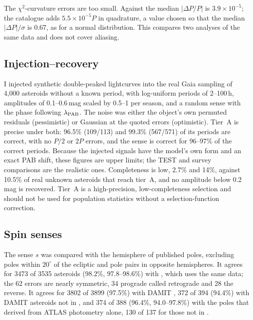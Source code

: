 The $\chi^2$-curvature errors are too small. Against \citet{Durech2023} the median $|\Delta P/P|$ is
$3.9\times10^{-5}$; the catalogue adds $5.5\times10^{-5}P$ in quadrature, a value chosen so that the median
$|\Delta P|/\sigma$ is 0.67, as for a normal distribution. This compares two analyses of the same data and
does not cover aliasing.

\subsection{Injection--recovery}

I injected synthetic double-peaked lightcurves into the real Gaia sampling of 4{,}000 asteroids without a
known period, with log-uniform periods of 2--100\,h, amplitudes of 0.1--0.6\,mag scaled by 0.5--1 per
season, and a random sense with the phase following $\lambda_{\rm PAB}$. The noise was either the object's
own permuted residuals (pessimistic) or Gaussian at the quoted errors (optimistic). Tier~A is precise under
both: 96.5\% (109/113) and 99.3\% (567/571) of its periods are correct, with no $P/2$ or $2P$ errors, and the
sense is correct for 96--97\% of the correct periods. Because the injected signals have the model's own form
and an exact PAB shift, these figures are upper limits; the TEST and survey comparisons are the realistic
ones. Completeness is low, 2.7\% and 14\%, against 10.5\% of real unknown asteroids that reach tier~A, and
no amplitude below 0.2\,mag is recovered. Tier~A is a high-precision, low-completeness selection and should
not be used for population statistics without a selection-function correction.

\subsection{Spin senses}\label{sec:spin}

The sense $s$ was compared with the hemisphere of published poles, excluding poles within $20^\circ$ of the
ecliptic and pole pairs in opposite hemispheres. It agrees for 3473 of 3535 asteroids (98.2\%, 97.8--98.6\%)
with \citet{Durech2023}, which uses the same data; the 62 errors are nearly symmetric, 34 prograde called
retrograde and 28 the reverse. It agrees for 3802 of 3899 (97.5\%) with DAMIT \citep{Durech2010}, 372 of 394
(94.4\%) with DAMIT asteroids not in \citet{Durech2023}, and 374 of 388 (96.4\%, 94.0--97.8\%) with the poles
that \citet{Durech2020} derived from ATLAS photometry alone, 130 of 137 for those not in \citet{Durech2023}.

